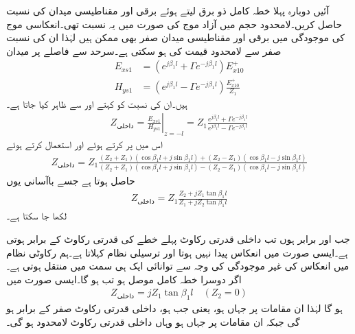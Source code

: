 آئیں دوبارہ پہلا خطہ کامل ذو برق لیتے ہوئے برقی اور مقناطیسی میدان کی نسبت  حاصل کریں۔لامحدود حجم میں آزاد موج کی صورت میں یہ نسبت   تھی۔انعکاسی موج کی موجودگی میں برقی اور مقناطیسی میدان صفر بھی ممکن ہیں لہٰذا ان کی نسبت  صفر سے لامحدود قیمت کی ہو سکتی ہے۔سرحد سے  فاصلے پر میدان
 \begin{align*}
E_{xs1}&=\left(e^{j \beta_1 l}+ \Gamma e^{-j \beta_1 l} \right)E_{x10}^+ \\
H_{ys1}&=\left(e^{j \beta_1 l}- \Gamma e^{-j \beta_1 l} \right) \frac{E_{x10}^+}{Z_1}
\end{align*}
ہیں۔ان کی نسبت  کو  کہتے اور  سے ظاہر کیا جاتا ہے۔
\begin{align*}
Z_{\text{داخلی}}=\left. \frac{E_{xs1}}{H_{ys1}} \right|_{z=-l}=Z_1 \frac{e^{j \beta_1 l}+ \Gamma e^{-j \beta_1 l}}{e^{j \beta_1 l}- \Gamma e^{-j \beta_1 l}}
\end{align*}
اس میں  پر کرتے ہوئے اور   استعمال کرتے ہوئے
\begin{align*}
Z_{\text{داخلی}}=Z_1 \frac{(Z_2+Z_1)(\cos \beta_1 l +j \sin \beta_1 l)+(Z_2-Z_1)(\cos \beta_1 l -j \sin \beta_1 l)}{(Z_2+Z_1)(\cos \beta_1 l +j \sin \beta_1 l)-(Z_2-Z_1)(\cos \beta_1 l -j \sin \beta_1 l)}
\end{align*}
حاصل ہوتا ہے  جسے باآسانی یوں
\begin{align}\label{مساوات+موج_ترسیلی_نظام_داخلی_قدرتی_رکاوٹ_تعریف}
Z_{\text{داخلی}}=Z_1 \frac{Z_2 +j Z_1 \tan \beta_1 l}{Z_1+j Z_2 \tan \beta_1 l}
\end{align}
لکھا جا سکتا ہے۔

جب  اور  برابر ہوں تب داخلی قدرتی رکاوٹ  پہلے خطے کی قدرتی رکاوٹ  کے برابر ہوتی ہے۔ایسی صورت میں انعکاس پیدا نہیں ہوتا اور  ترسیلی نظام  کہلاتا ہے۔ہم رکاوٹی نظام میں انعکاس کی غیر موجودگی کی وجہ سے توانائی ایک ہی سمت میں منتقل ہوتی ہے۔اگر دوسرا خطہ کامل موصل ہو تب  ہو گا۔ایسی صورت میں
\begin{align}
Z_{\text{داخلی}}=j Z_1 \tan \beta_1 l \quad (Z_2=0)
\end{align}
ہو گا لہٰذا ان مقامات پر جہاں  ہو، یعنی جب  ہو، داخلی قدرتی رکاوٹ صفر کے برابر ہو گی جبکہ ان مقامات پر جہاں  ہو وہاں داخلی قدرتی رکاوٹ لامحدود ہو گی۔

